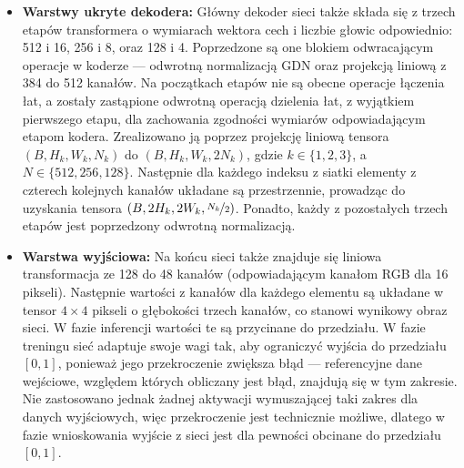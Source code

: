 \begin{itemize}
\begin{itemize}
		\item \textbf{Model parametrów rozkładów:} Predykcje z modelu hiperprior'a i modelu kontekstowego są łączone poprzez konkatenację, co prowadzi do uzyskania tensora o wymiarze \( \left(B, 1536, \nicefrac{H}{16}, \nicefrac{W}{16} \right) \). Przekazuje się go do modelu entropijnego złożonego z trzech warstw splotowych o jądrze \( 1 \times 1 \), co efektywnie czyni je warstwami liniowymi. Ich wymiary przestrzenne pozostają niezmienne, tj. \( \left( \nicefrac{H}{16}, \nicefrac{W}{16} \right) \), zaś liczba kanałów skaluje się kolejno z 4N do \( \frac{10N}{3} \), z \( \frac{10N}{3} \) do \( \frac{8N}{3} \) i z \( \frac{8N}{3} \) do 2N.
		\item \
		\item \textbf{Koder arytmetyczny:} Mając wiedzę jakie są parametry rozkładu Gaussa z przygotowanej a priori tabeli wybierane są skumulowane prawdopodobieństwa dla skwantowanych symboli i podanych parametrów, przeskalowane do 16-bitowej liczby całkowitej. Z tych danych koder arytmetyczny, koduje symbole do strumienia bitów.
	\end{itemize}
	\item \textbf{Warstwy ukryte dekodera:} Główny dekoder sieci także składa się z trzech etapów transformera o wymiarach wektora cech i liczbie głowic odpowiednio: 512 i 16, 256 i 8, oraz 128 i 4. Poprzedzone są one blokiem odwracającym operacje w koderze --- odwrotną normalizacją GDN oraz projekcją liniową z 384 do 512 kanałów. Na początkach etapów nie są obecne operacje łączenia łat, a zostały zastąpione odwrotną operacją dzielenia łat, z wyjątkiem pierwszego etapu, dla zachowania zgodności wymiarów odpowiadającym etapom kodera. Zrealizowano ją poprzez projekcję liniową tensora \( \left(B, H_{k}, W_{k}, N_{k} \right) \) do \( \left(B, H_{k}, W_{k}, 2N_{k} \right) \), gdzie \(k \in \{ 1, 2, 3 \} \), a \( N \in \{ 512, 256, 128 \} \). Następnie dla każdego indeksu z siatki elementy z czterech kolejnych kanałów układane są przestrzennie, prowadząc do uzyskania tensora \( \left(B, 2H_{k}, 2W_{k}, \nicefrac{N_{k}}{2} \right) \). Ponadto, każdy z pozostałych trzech etapów jest poprzedzony odwrotną normalizacją.
	\item \textbf{Warstwa wyjściowa:} Na końcu sieci także znajduje się liniowa transformacja ze 128 do 48 kanałów (odpowiadającym kanałom RGB dla 16 pikseli). Następnie wartości z kanałów dla każdego elementu są układane w tensor \( 4 \times 4 \) pikseli o głębokości trzech kanałów, co stanowi wynikowy obraz sieci. W fazie inferencji wartości te są przycinane do przedziału. W fazie treningu sieć adaptuje swoje wagi tak, aby ograniczyć wyjścia do przedziału \( \left[ 0, 1 \right] \), ponieważ jego przekroczenie zwiększa błąd --- referencyjne dane wejściowe, względem których obliczany jest błąd, znajdują się w tym zakresie. Nie zastosowano jednak żadnej aktywacji wymuszającej taki zakres dla danych wyjściowych, więc przekroczenie jest technicznie możliwe, dlatego w fazie wnioskowania wyjście z sieci jest dla pewności obcinane do przedziału \( \left[ 0, 1 \right] \).
\end{itemize}

